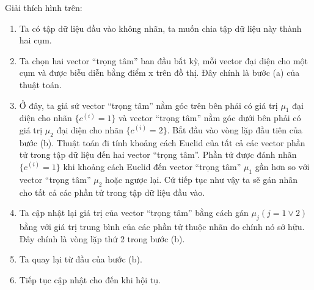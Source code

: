 \begin{enumerate}
  Giải thích hình trên:
  \begin{enumerate}
    \item Ta có tập dữ liệu đầu vào không nhãn, ta muốn chia tập dữ liệu
    này thành hai cụm.
    \item Ta chọn hai vector “trọng tâm” ban đầu bất kỳ, mỗi vector đại diện cho
    một cụm và được biễu diễn bằng điểm x trên đồ thị. Đây chính là bước (a) của thuật toán.
    \item Ở đây, ta giả sử vector “trọng tâm” nằm góc trên bên phải có giá trị
    $\mu_1$ đại diện cho nhãn $\{c^{(i)}=1\}$ và vector “trọng tâm” nằm góc dưới
    bên phải có giá trị $\mu_2$ đại diện cho nhãn $\{c^{(i)}=2\}$. Bắt đầu vào
    vòng lặp đầu tiên của bước (b). Thuật toán đi tính khoảng cách Euclid của
    tất cả các vector phần tử trong tập dữ liệu đến hai vector “trọng tâm”. Phần
    tử được đánh nhãn $\{c^{(i)}=1\}$ khi khoảng cách Euclid đến vector “trọng
    tâm” $\mu_1$ gần hơn so với vector “trọng tâm” $\mu_2$ hoặc ngược lại. Cứ
    tiếp tục như vậy ta sẽ gán nhãn cho tất cả các phần tử trong tập dữ liệu đầu vào.
    \item Ta cập nhật lại giá trị của vector “trọng tâm” bằng cách gán
    $\mu_j(j=1 \vee 2)$ bằng với giá trị trung bình của các phần tử thuộc nhãn
    do chính nó sở hữu. Đây chính là vòng lặp thứ 2 trong bước (b).
    \item Ta quay lại từ đầu của bước (b).
    \item Tiếp tục cập nhật cho đến khi hội tụ.
  \end{enumerate}
\end{enumerate}
